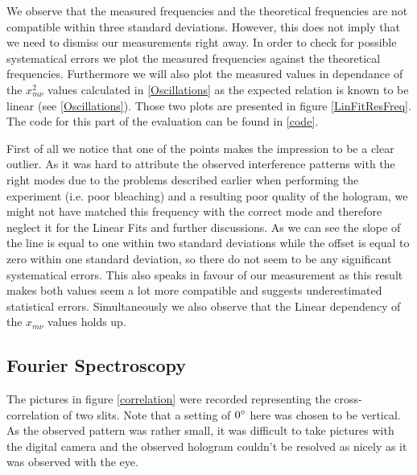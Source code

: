 We observe that the measured frequencies and the theoretical frequencies are not compatible within three standard deviations. However, this does not imply that we need to dismiss our measurements right away. In order to check for possible systematical errors we plot the measured frequencies against the theoretical frequencies. Furthermore we will also plot the measured values in dependance of the $x_{m\nu}^2$ values calculated in \ref{Oscillations} as the expected relation is known to be linear (see \ref{Oscillations}). Those two plots are presented in figure \ref{LinFitResFreq}. The code for this part of the evaluation can be found in \ref{code}.


First of all we notice that one of the points makes the impression to be a clear outlier. As it was hard to attribute the observed interference patterns with the right modes due to the problems described earlier when performing the experiment (i.e. poor bleaching) and a resulting poor quality of the hologram, we might not have matched this frequency with the correct mode and therefore neglect it for the Linear Fits and further discussions.
As we can see the slope of the line is equal to one within two standard deviations while the offset is equal to zero within one standard deviation, so there do not seem to be any significant systematical errors. This also speaks in favour of our measurement as this result makes both values seem a lot more compatible and suggests underestimated statistical errors. Simultaneously we also observe that the Linear dependency of the $x_{m\nu}$ values holds up. 


\subsection{Fourier Spectroscopy}

The pictures in figure \ref{correlation} were recorded representing the cross-correlation of two slits. Note that a setting of $0^\circ$ here was chosen to be vertical. As the observed pattern was rather small, it was difficult to take pictures with the digital camera and the observed hologram couldn't be resolved as nicely as it was observed with the eye.


